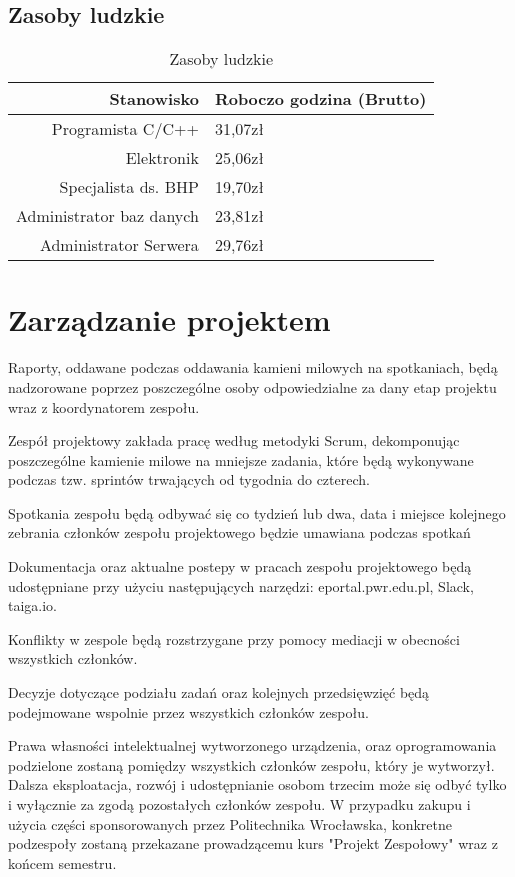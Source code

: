 \documentclass[10pt, a4paper]{article}
\begin{document}
\subsection{Zasoby ludzkie}

\begin{table}[H]
		\centering
		\begin{tabular}{|r|l|} \hline
			\textbf{Stanowisko} & \textbf{Roboczo godzina (Brutto)} \\
			\hline
			Programista C/C++ & 31,07zł\\
			Elektronik & 25,06zł\\
			Specjalista ds. BHP& 19,70zł\\ 
			Administrator baz danych & 23,81zł\\
			Administrator Serwera & 29,76zł\\ 
			\hline
		\end{tabular}
		\caption{Zasoby ludzkie}
		\label{tab:Ludzie}
	\end{table}

\section{Zarządzanie projektem}
\begin{description}[font=$\bullet$~\normalfont]
\item Raporty, oddawane podczas oddawania kamieni milowych na spotkaniach, będą nadzorowane poprzez poszczególne osoby odpowiedzialne za dany etap projektu wraz z koordynatorem zespołu.
\item Zespół projektowy zakłada pracę według metodyki Scrum, dekomponując poszczególne kamienie milowe na mniejsze zadania, które będą wykonywane podczas tzw. sprintów trwających od tygodnia do czterech.
\item Spotkania zespołu będą odbywać się co tydzień lub dwa, data i miejsce kolejnego zebrania członków zespołu projektowego będzie umawiana podczas spotkań
\item Dokumentacja oraz aktualne postepy w pracach zespołu projektowego będą udostępniane przy użyciu następujących narzędzi: eportal.pwr.edu.pl, Slack, taiga.io.
\item Konflikty w zespole będą rozstrzygane przy pomocy mediacji w obecności wszystkich członków. \item Decyzje dotyczące podziału zadań oraz kolejnych przedsięwzięć będą podejmowane wspolnie przez wszystkich członków zespołu.
\item Prawa własności intelektualnej wytworzonego urządzenia, oraz oprogramowania podzielone zostaną pomiędzy wszystkich członków zespołu, który je wytworzył. Dalsza eksploatacja, rozwój  i udostępnianie osobom trzecim może się odbyć tylko i wyłącznie za zgodą pozostałych członków zespołu. W przypadku zakupu i użycia części sponsorowanych przez Politechnika Wrocławska, konkretne podzespoły zostaną przekazane prowadzącemu kurs "Projekt Zespołowy" wraz z końcem semestru.
\end{description}
\end{document}
